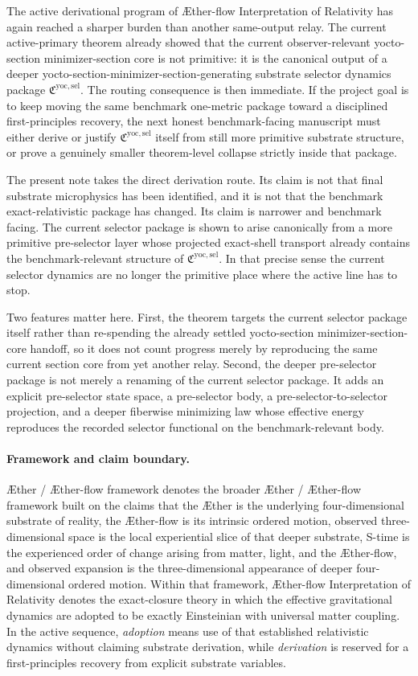 \documentclass[11pt]{article}
\newcommand{\Aether}{\AE{}ther}
\newcommand{\Aflow}{\AE{}ther-flow}
\newcommand{\TheoryName}{\Aflow{} Interpretation of Relativity}
\newcommand{\TheoryProgram}{\Aether{} / \Aflow{} framework}
\newcommand{\YoctoSelectorPackage}{\mathfrak C^{\mathrm{yoc,sel}}}
\begin{document}
The active derivational program of \TheoryName{} has again reached a sharper burden than another same-output relay. The current active-primary theorem already showed that the current observer-relevant yocto-section minimizer-section core is not primitive: it is the canonical output of a deeper yocto-section-minimizer-section-generating substrate selector dynamics package \(\YoctoSelectorPackage\). The routing consequence is then immediate. If the project goal is to keep moving the same benchmark one-metric package toward a disciplined first-principles recovery, the next honest benchmark-facing manuscript must either derive or justify \(\YoctoSelectorPackage\) itself from still more primitive substrate structure, or prove a genuinely smaller theorem-level collapse strictly inside that package.

The present note takes the direct derivation route. Its claim is not that final substrate microphysics has been identified, and it is not that the benchmark exact-relativistic package has changed. Its claim is narrower and benchmark facing. The current selector package is shown to arise canonically from a more primitive pre-selector layer whose projected exact-shell transport already contains the benchmark-relevant structure of \(\YoctoSelectorPackage\). In that precise sense the current selector dynamics are no longer the primitive place where the active line has to stop.

Two features matter here. First, the theorem targets the current selector package itself rather than re-spending the already settled yocto-section minimizer-section-core handoff, so it does not count progress merely by reproducing the same current section core from yet another relay. Second, the deeper pre-selector package is not merely a renaming of the current selector package. It adds an explicit pre-selector state space, a pre-selector body, a pre-selector-to-selector projection, and a deeper fiberwise minimizing law whose effective energy reproduces the recorded selector functional on the benchmark-relevant body.

\paragraph{Framework and claim boundary.}
\TheoryProgram{} denotes the broader \Aether{} / \Aflow{} framework built on the claims that the \Aether{} is the underlying four-dimensional substrate of reality, the \Aflow{} is its intrinsic ordered motion, observed three-dimensional space is the local experiential slice of that deeper substrate, S-time is the experienced order of change arising from matter, light, and the \Aflow{}, and observed expansion is the three-dimensional appearance of deeper four-dimensional ordered motion. Within that framework, \TheoryName{} denotes the exact-closure theory in which the effective gravitational dynamics are adopted to be exactly Einsteinian with universal matter coupling. In the active sequence, \emph{adoption} means use of that established relativistic dynamics without claiming substrate derivation, while \emph{derivation} is reserved for a first-principles recovery from explicit substrate variables.
\end{document}
